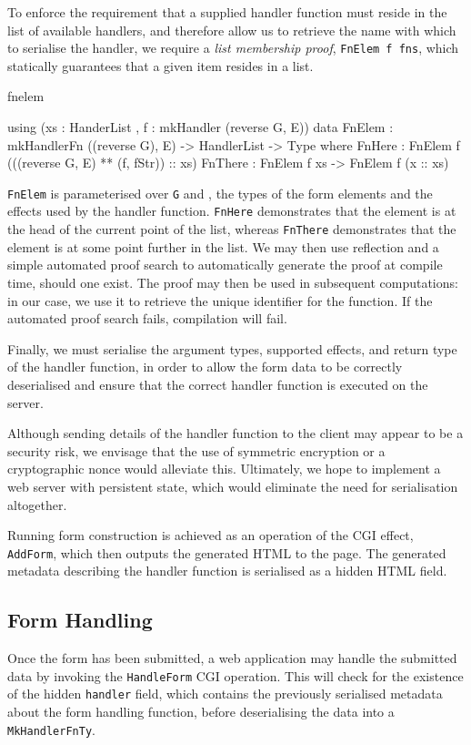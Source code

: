 To enforce the requirement that a supplied handler function must reside in the
list of available handlers, and therefore allow us to retrieve the name with
which to serialise the handler, we require a \textit{list membership proof},
\texttt{FnElem f fns}, which statically guarantees that a given item resides in
a list.

\begin{SaveVerbatim}{fnelem}

using (xs : HanderList , f : mkHandler (reverse G, E))
  data FnElem : mkHandlerFn ((reverse G), E) -> 
                HandlerList -> Type where
       FnHere  : FnElem f (((reverse G, E) ** 
                                  (f, fStr)) :: xs)
       FnThere : FnElem f xs -> FnElem f (x :: xs)

\end{SaveVerbatim}

\noindent
\texttt{FnElem} is parameterised over \texttt{G} and , the types of the
form elements and the effects used by the handler function. \texttt{FnHere}
demonstrates that the element is at the head of the current point of the list,
whereas \texttt{FnThere} demonstrates that the element is at some point further
in the list. 
We may then use reflection and a simple automated proof search to
automatically generate the proof at compile time, should one exist. The proof
may then be used in subsequent computations: in our case, we use it to retrieve
the unique identifier for the function. If the automated proof search fails,
compilation will fail.

Finally, we must serialise the argument types, supported effects, and return
type of the handler function, in order to allow the form data to be correctly
deserialised and ensure that the correct handler function is executed on the
server. 

Although sending details of the handler function to the client may appear to be
a security risk, we envisage that the use of symmetric encryption or a
cryptographic nonce would alleviate this. Ultimately, we hope to implement a
web server with persistent state, which would eliminate the need for
serialisation altogether.

Running form construction is achieved as an operation of the CGI
effect, \texttt{AddForm}, which then outputs the generated HTML to the page.
The generated metadata describing the handler function is serialised as a
hidden HTML field.

\subsection{Form Handling}
\label{formhandling}
Once the form has been submitted, a web application may handle the submitted
data by invoking the \texttt{HandleForm} CGI operation. This will check for the
existence of the hidden \texttt{handler} field, which contains the previously
serialised metadata about the form handling function, before deserialising the
data into a \texttt{MkHandlerFnTy}. 

